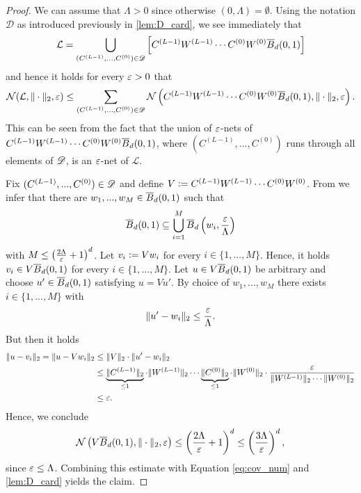 \begin{proof}
We can assume that $\Lambda > 0$ since otherwise $(0, \Lambda) = \emptyset$. Using the notation $\mathscr{D}$ as introduced previously in \cref{lem:D_card}, we see immediately that
\begin{equation*}
\mathcal{L} = \bigcup_{(C^{(L-1)}, ..., C^{(0)}) \in \mathscr{D}} \left[ C^{(L-1)}W^{(L-1)} \cdots C^{(0)}W^{(0)} \overline{B}_d(0,1) \right]
\end{equation*}
and hence it holds for every $\varepsilon > 0$ that
\begin{equation}\label{eq:cov_num}
\mathcal{N}(\mathcal{L}, \Vert \cdot \Vert_2, \varepsilon) \leq \sum_{(C^{(L-1)}, ..., C^{(0)}) \in \mathscr{D}} \mathcal{N}\left(C^{(L-1)}W^{(L-1)} \cdots C^{(0)}W^{(0)} \overline{B}_d(0,1), \Vert \cdot \Vert_2, \varepsilon \right).
\end{equation}
This can be seen from the fact that the union of $\varepsilon$-nets of $C^{(L-1)}W^{(L-1)} \cdots C^{(0)}W^{(0)} \overline{B}_d(0,1)$, where $(C^{(L-1)}, ..., C^{(0)})$ runs through all elements of $\mathscr{D}$, is an $\varepsilon$-net of $\mathcal{L}$.

Fix $(C^{(L-1)}, ..., C^{(0)}) \in \mathscr{D}$ and define $V \mathrel{\mathop:}= C^{(L-1)}W^{(L-1)} \cdots C^{(0)}W^{(0)}$. 
From  we infer that there are $w_1, ..., w_M \in \overline{B}_d(0,1)$ such that
\begin{equation*}
\overline{B}_d(0,1) \subseteq \bigcup_{i=1}^M \overline{B}_d\left(w_i,\frac{\varepsilon}{\Lambda}\right)
\end{equation*}
with $M \leq \left(\frac{2 \Lambda}{\varepsilon} + 1\right)^d$. 
Let $v_i \mathrel{\mathop:}= Vw_i$ for every $i \in \{1,...,M\}$. 
Hence, it holds $v_i \in V\overline{B}_d(0,1)$ for every $i \in \{1,...,M\}$. Let $u \in V \overline{B}_d(0,1)$ be arbitrary and choose $u' \in \overline{B}_d(0,1)$ satisfying $ u = Vu'$. 
By choice of $w_1, ..., w_M$ there exists $i \in \{1,...,M\}$ with 
\begin{equation*}
\Vert u' - w_i \Vert_2 \leq \frac{\varepsilon}{\Lambda}.
\end{equation*}
But then it holds
\begin{align*}
  \Vert u - v_i \Vert_2 =\Vert u - Vw_i \Vert_2 
&\leq \Vert V  \Vert_2 \cdot \Vert u' - w_i \Vert_2 \\
&\leq \underbrace{\Vert C^{(L-1)} \Vert_2}_{\leq 1} \cdot \Vert W^{(L-1)} \Vert_2 \cdots \underbrace{\Vert C^{(0)} \Vert_2}_{\leq 1} \cdot \Vert W^{(0)} \Vert_2 \cdot \frac{\varepsilon}{\Vert W^{(L-1)} \Vert_2 \cdots \Vert W^{(0)} \Vert_2} \\
&\leq \varepsilon.
\end{align*}
Hence, we conclude
\begin{equation*}
\mathcal{N}\left(V\overline{B}_d(0,1), \Vert \cdot \Vert_2, \varepsilon \right) \leq \left(\frac{2 \Lambda}{\varepsilon} + 1\right)^d \leq \left(\frac{3 \Lambda}{\varepsilon}\right)^d,
\end{equation*}
since $\varepsilon \leq \Lambda$. Combining this estimate with Equation \eqref{eq:cov_num} and \cref{lem:D_card} yields the claim.
\end{proof}

